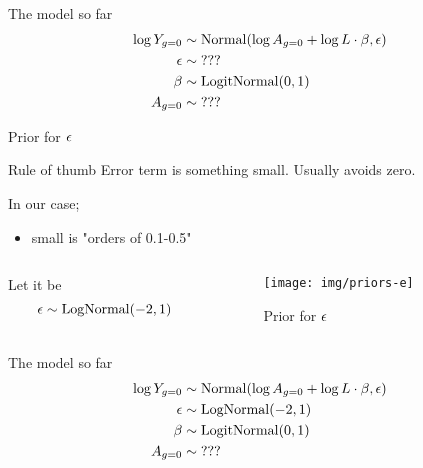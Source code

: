 \documentclass{beamer}
\begin{document}
\begin{frame}{The model so far}
    \begin{align*}
        \log Y_{g=0} &\sim \operatorname{Normal}(\log A_{g=0} + \log L \cdot \beta, {\epsilon})\\
        {\epsilon} &\sim \text{???}\\
        \beta &\sim \operatorname{LogitNormal}(0, 1)\\
        A_{g=0} &\sim \text{???}\\
    \end{align*}
\end{frame}
\begin{frame}{Prior for ${\epsilon}$}
    \begin{block}{Rule of thumb}
    Error term is something small. Usually avoids zero.
    \end{block}
    In our case;
    \begin{itemize}
        \item small is "orders of 0.1-0.5"
    \end{itemize}

    \begin{columns}
    \begin{column}{0.5\linewidth}
    Let it be
    \begin{equation*}
        {\epsilon} \sim \operatorname{LogNormal}(-2, 1)
    \end{equation*}
    \end{column}
    \begin{column}{0.5\linewidth}
    \begin{figure}
        \centering
        \texttt{[image: img/priors-e]}
        \caption{Prior for ${\epsilon}$}
    \end{figure}
    \end{column}
    \end{columns}
\end{frame}
\begin{frame}{The model so far}
    \begin{align*}
        \log Y_{g=0} &\sim \operatorname{Normal}(\log A_{g=0} + \log L \cdot \beta, {\epsilon})\\
        {\epsilon} &\sim \operatorname{LogNormal}(-2, 1)\\
        \beta &\sim \operatorname{LogitNormal}(0, 1)\\
        A_{g=0} &\sim \text{???}\\
    \end{align*}
\end{frame}
\end{document}

